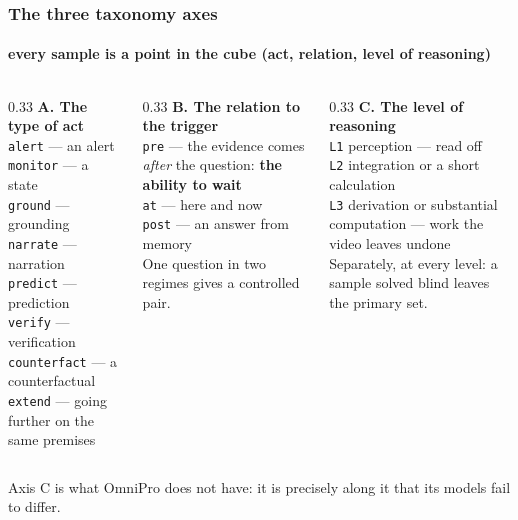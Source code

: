 \documentclass[aspectratio=169,10pt]{beamer}
\newcommand{\lead}[1]{{\color{warm}\textbf{#1}}}
\begin{document}
\begin{frame}
  \frametitle{The three taxonomy axes}
  \framesubtitle{every sample is a point in the cube (act, relation, level of reasoning)}

  \begin{columns}[T]
    \begin{column}{0.33\textwidth}
      {\bfseries A. The type of act}\\[0.4em]
      {\small
      \texttt{alert} — an alert\\
      \texttt{monitor} — a state\\
      \texttt{ground} — grounding\\
      \texttt{narrate} — narration\\
      \texttt{predict} — prediction\\
      \texttt{verify} — verification\\
      \texttt{counterfact} — a counterfactual\\
      \texttt{extend} — going further on the same premises}
    \end{column}
    \begin{column}{0.33\textwidth}
      {\bfseries B. The relation to the trigger}\\[0.4em]
      {\small
      \texttt{pre} — the evidence comes \emph{after} the question: \lead{the ability to wait}\\[0.3em]
      \texttt{at} — here and now\\[0.3em]
      \texttt{post} — an answer from memory\\[0.5em]
      \color{muted} One question in two regimes gives a controlled pair.}
    \end{column}
    \begin{column}{0.33\textwidth}
      {\bfseries C. The level of reasoning}\\[0.4em]
      {\small
      \texttt{L1} perception — read off\\[0.3em]
      \texttt{L2} integration or a short calculation\\[0.3em]
      \texttt{L3} derivation or substantial computation — work the video leaves undone\\[0.5em]
      \color{muted} Separately, at every level: a sample solved blind leaves the primary set.}
    \end{column}
  \end{columns}

  \vspace{0.9em}
  {\color{muted}\small Axis C is what OmniPro does not have: it is precisely along it that its models fail to differ.}
\end{frame}
\end{document}
